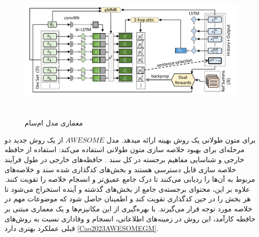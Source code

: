 \begin{figure}[!h]
	\begin{center}
		\includegraphics[height=7cm]{query-assited.png}
	\end{center}
	\caption{ معماری مدل  ام‌سام \cite{shapira-etal-2022-interactive}} 
	\label{fig:MSumm}
	
	\medskip
	
\end{figure}








برای متون طولانی یک روش بهینه ارائه میدهد.
مدل $ AWESOME $ از یک روش جدید دو مرحله‌ای برای بهبود خلاصه سازی متون طولانی استفاده می‌کند: استفاده از حافظه خارجی و شناسایی مفاهیم برجسته در کل سند
. حافظه‌های خارجی در طول فرآیند خلاصه سازی قابل دسترسی هستند و بخش‌های کدگذاری شده سند و خلاصه‌های مربوط به آن‌ها را ردیابی می‌کنند تا درک جامع عمیق‌تر و انسجام خلاصه را تقویت کنند. علاوه بر این، محتوای برجسته‌ی جامع از بخش‌های گذشته و آینده استخراج می‌شود تا هر بخش را در حین کدگذاری تقویت کند و اطمینان حاصل شود که موضوعات مهم در خلاصه مورد توجه قرار می‌گیرند. با بهره‌گیری از این مکانیزم‌ها و یک معماری مبتنی بر حافظه کارآمد، این روش در زمینه‌های اطلاعاتی، انسجام و وفاداری نسبت به روش‌های قبلی عملکرد بهتری دارد
\ref{Cao2023AWESOMEGM}.
